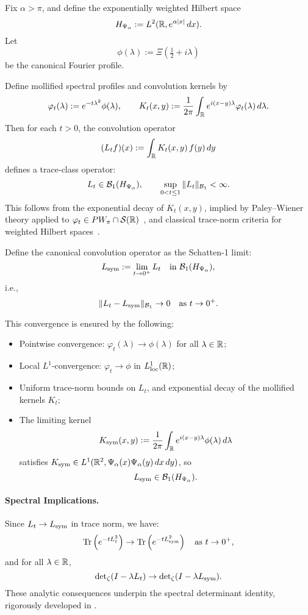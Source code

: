 \begin{lemma}
\label{lem:trace_norm_convergence_Lt_to_Lsym}
Fix \( \alpha > \pi \), and define the exponentially weighted Hilbert space
\[
H_{\Psi_\alpha} := L^2(\mathbb{R}, e^{\alpha|x|}\, dx).
\]
Let
\[
\phi(\lambda) := \Xi\left( \tfrac{1}{2} + i\lambda \right)
\]
be the canonical Fourier profile.

Define mollified spectral profiles and convolution kernels by
\[
\varphi_t(\lambda) := e^{-t\lambda^2} \phi(\lambda), \qquad
K_t(x,y) := \frac{1}{2\pi} \int_{\mathbb{R}} e^{i(x - y)\lambda} \varphi_t(\lambda)\, d\lambda.
\]
Then for each \( t > 0 \), the convolution operator
\[
(L_t f)(x) := \int_{\mathbb{R}} K_t(x, y)\, f(y)\, dy
\]
defines a trace-class operator:
\[
L_t \in \mathcal{B}_1(H_{\Psi_\alpha}), \qquad \sup_{0 < t \le 1} \| L_t \|_{\mathcal{B}_1} < \infty.
\]
This follows from the exponential decay of \( K_t(x,y) \), implied by Paley--Wiener theory applied to \( \varphi_t \in PW_\pi \cap \mathcal{S}(\mathbb{R}) \)~\cite[Thm.~IX.12]{ReedSimon1975II}, and classical trace-norm criteria for weighted Hilbert spaces~\cite[Ch.~4]{Simon2005TraceIdeals}.

\medskip

Define the canonical convolution operator as the Schatten-1 limit:
\[
L_{\mathrm{sym}} := \lim_{t \to 0^+} L_t \quad \text{in } \mathcal{B}_1(H_{\Psi_\alpha}),
\]
i.e.,
\[
\| L_t - L_{\mathrm{sym}} \|_{\mathcal{B}_1} \to 0 \quad \text{as } t \to 0^+.
\]

This convergence is ensured by the following:

\begin{itemize}
  \item Pointwise convergence: \( \varphi_t(\lambda) \to \phi(\lambda) \) for all \( \lambda \in \mathbb{R} \);
  \item Local \( L^1 \)-convergence: \( \varphi_t \to \phi \) in \( L^1_{\mathrm{loc}}(\mathbb{R}) \);
  \item Uniform trace-norm bounds on \( L_t \), and exponential decay of the mollified kernels \( K_t \);
  \item The limiting kernel
  \[
  K_{\mathrm{sym}}(x,y) := \frac{1}{2\pi} \int_{\mathbb{R}} e^{i(x-y)\lambda} \phi(\lambda)\, d\lambda
  \]
  satisfies \( K_{\mathrm{sym}} \in L^1(\mathbb{R}^2, \Psi_\alpha(x)\Psi_\alpha(y)\, dx\, dy) \), so
  \[
  L_{\mathrm{sym}} \in \mathcal{B}_1(H_{\Psi_\alpha}).
  \]
\end{itemize}

\paragraph{Spectral Implications.}
Since \( L_t \to L_{\mathrm{sym}} \) in trace norm, we have:
\[
\operatorname{Tr}\left(e^{-tL_t^2}\right) \to \operatorname{Tr}\left(e^{-tL_{\mathrm{sym}}^2}\right) \quad \text{as } t \to 0^+,
\]
and for all \( \lambda \in \mathbb{R} \),
\[
\det\nolimits_{\zeta}(I - \lambda L_t) \to \det\nolimits_{\zeta}(I - \lambda L_{\mathrm{sym}}).
\]
These analytic consequences underpin the spectral determinant identity, rigorously developed in .
\end{lemma}
